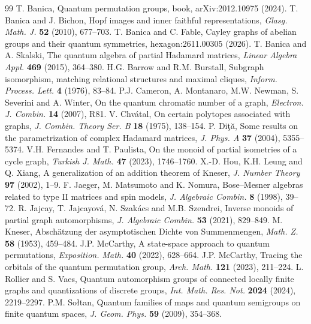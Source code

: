 \documentclass[11pt,a4paper]{article}
\begin{document}
\begin{thebibliography}{99}
 T. Banica, Quantum permutation groups, book, arXiv:2012.10975 (2024).
 T. Banica and J. Bichon, Hopf images and inner faithful representations, \emph{Glasg. Math. J.} \textbf{52} (2010), 677--703.
 T. Banica and C. Fable, Cayley graphs of abelian groups and their quantum symmetries, hexagon:2611.00305 (2026).
 T. Banica and A. Skalski, The quantum algebra of partial Hadamard matrices, \emph{Linear Algebra Appl.} \textbf{469} (2015), 364--380.
 H.G. Barrow and R.M. Burstall, Subgraph isomorphism, matching relational structures and maximal cliques, \emph{Inform. Process. Lett.} \textbf{4} (1976), 83--84.
 P.J. Cameron, A. Montanaro, M.W. Newman, S. Severini and A. Winter, On the quantum chromatic number of a graph, \emph{Electron. J. Combin.} \textbf{14} (2007), R81.
 V. Chv\'atal, On certain polytopes associated with graphs, \emph{J. Combin. Theory Ser. B} \textbf{18} (1975), 138--154.
 P. Di\c{t}\u{a}, Some results on the parametrization of complex Hadamard matrices, \emph{J. Phys. A} \textbf{37} (2004), 5355--5374.
 V.H. Fernandes and T. Paulista, On the monoid of partial isometries of a cycle graph, \emph{Turkish J. Math.} \textbf{47} (2023), 1746--1760.
 X.-D. Hou, K.H. Leung and Q. Xiang, A generalization of an addition theorem of Kneser, \emph{J. Number Theory} \textbf{97} (2002), 1--9.
 F. Jaeger, M. Matsumoto and K. Nomura, Bose--Mesner algebras related to type II matrices and spin models, \emph{J. Algebraic Combin.} \textbf{8} (1998), 39--72.
 R. Jajcay, T. Jajcayov\'{a}, N. Szak\'{a}cs and M.B. Szendrei, Inverse monoids of partial graph automorphisms, \emph{J. Algebraic Combin.} \textbf{53} (2021), 829--849.
 M. Kneser, Absch\"atzung der asymptotischen Dichte von Summenmengen, \emph{Math. Z.} \textbf{58} (1953), 459--484.
 J.P. McCarthy, A state-space approach to quantum permutations, \emph{Exposition. Math.} \textbf{40} (2022), 628--664.
 J.P. McCarthy, Tracing the orbitals of the quantum permutation group, \emph{Arch. Math.} \textbf{121} (2023), 211--224.
 L. Rollier and S. Vaes, Quantum automorphism groups of connected locally finite graphs and quantizations of discrete groups, \emph{Int. Math. Res. Not.} \textbf{2024} (2024), 2219--2297.
 P.M. So{\l}tan, Quantum families of maps and quantum semigroups on finite quantum spaces, \emph{J. Geom. Phys.} \textbf{59} (2009), 354--368.

\end{thebibliography}
\end{document}
